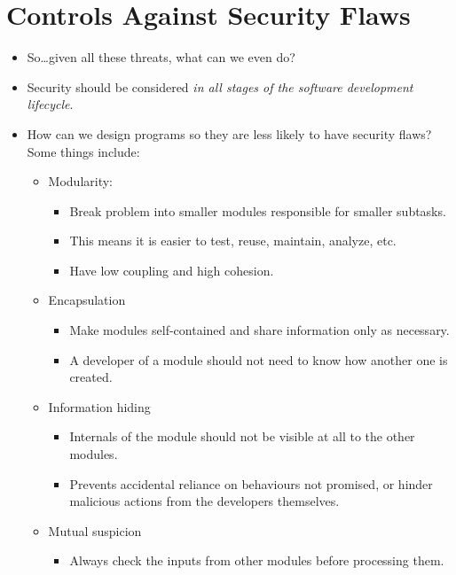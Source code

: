 \documentclass{article}
\begin{document}
\section{Controls Against Security Flaws}
\begin{itemize}
    \item So\dots given all these threats, what can we even do?
    \item Security should be considered \emph{in all stages of the software development lifecycle}.
    \item How can we design programs so they are less likely to have security flaws?  Some things include:
        \begin{itemize}
            \item Modularity:
                \begin{itemize}
                    \item Break problem into smaller modules responsible for smaller subtasks.
                    \item This means it is easier to test, reuse, maintain, analyze, etc.
                    \item Have low coupling and high cohesion.
                \end{itemize}
            \item Encapsulation
                \begin{itemize}
                    \item Make modules self-contained and share information only as necessary.
                    \item A developer of a module should not need to know how another one is created.
                \end{itemize}
            \item Information hiding
                \begin{itemize}
                    \item Internals of the module should not be visible at all to the other modules.
                    \item Prevents accidental reliance on behaviours not promised, or hinder malicious actions from the developers themselves.
                \end{itemize}
            \item Mutual suspicion
                \begin{itemize}
                    \item Always check the inputs from other modules before processing them.

\end{itemize}
\end{itemize}
\end{itemize}
\end{document}
